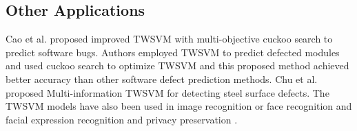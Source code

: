 \documentclass[pdflatex,sn-mathphys]{sn-jnl}%
\theoremstyle{thmstyleone}%
\theoremstyle{thmstyletwo}%
\theoremstyle{thmstylethree}%
\begin{document}
\subsection{Other Applications} 
Cao et al. \cite{cao2018improved} proposed improved TWSVM with multi-objective cuckoo search to predict software bugs. Authors employed TWSVM to predict defected modules and used cuckoo search to optimize TWSVM and this proposed method achieved better accuracy than other software defect prediction methods. Chu et al. \cite{chu2018multi} proposed Multi-information TWSVM for detecting steel surface defects. The TWSVM models have also been used in  image recognition or face recognition \cite{qi2013robust,peng2012twin,chen2018new,peng2013bi} and facial expression recognition \cite{richhariya2019facial} and privacy preservation \cite{anand2019privacy}.
\newline 
\newline
\setlength{\tabcolsep}{6pt} %
\renewcommand{\arraystretch}{2} %
\hspace*{-2.5cm}
\end{document}
